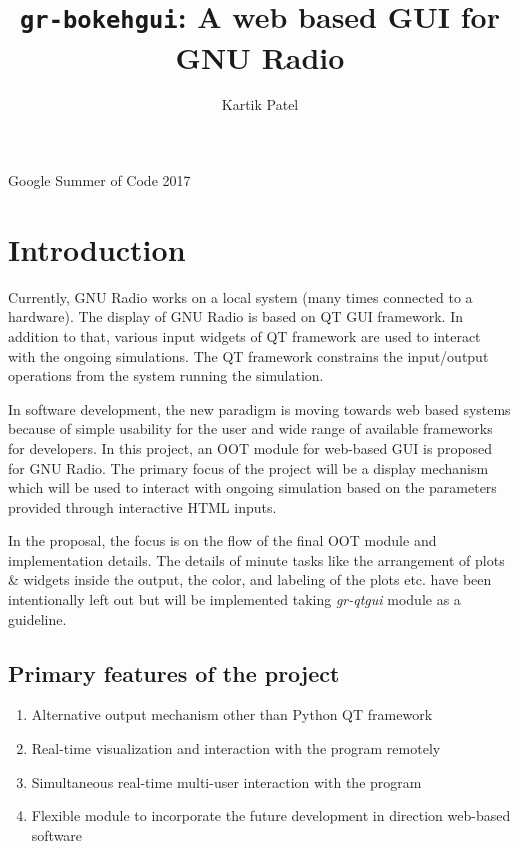 \documentclass[a4paper, 11pt]{article}
\title{\texttt{gr-bokehgui}: A web based GUI for GNU Radio}
\author{Kartik Patel}
\begin{document}
\newcommand{\pull}[1]{\href{https://github.com/gnuradio/gnuradio/pull/#1}{\# #1}}

\begin{center}
\Large Google Summer of Code 2017
\end{center}

{\let\newpage\relax\maketitle}

\section{Introduction}
Currently, GNU Radio works on a local system (many times connected to a hardware). The display of GNU Radio is based on QT GUI framework. In addition to that, various input widgets of QT framework are used to interact with the ongoing simulations. The QT framework constrains the input/output operations from the system running the simulation.

In software development, the new paradigm is moving towards web based systems because of simple usability for the user and wide range of available frameworks for developers. In this project, an OOT module for web-based GUI is proposed for GNU Radio. The primary focus of the project will be a display mechanism which will be used to interact with ongoing simulation based on the parameters provided through interactive HTML inputs.

In the proposal, the focus is on the flow of the final OOT module and implementation details. The details of minute tasks like the arrangement of plots \& widgets inside the output, the color, and labeling of the plots etc. have been intentionally left out but will be implemented taking \textit{gr-qtgui} module as a guideline.


\subsection{Primary features of the project}
\begin{enumerate}
\item Alternative output mechanism other than Python QT framework
\item Real-time visualization and interaction with the program remotely
\item Simultaneous real-time multi-user interaction with the program
\item Flexible module to incorporate the future development in direction web-based software
\end{enumerate}
\end{document}
